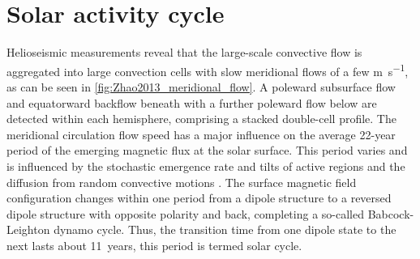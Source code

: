 \section{Solar activity cycle}
\label{sec:solar_activity_cycle}
Helioseismic measurements reveal that the large-scale convective flow is aggregated into large convection cells with slow meridional flows of a few \si{\m\per\s}, as can be seen in \autoref{fig:Zhao2013_meridional_flow}. A poleward subsurface flow and equatorward backflow beneath with a further poleward flow below are detected within each hemisphere, comprising a stacked double-cell profile. The meridional circulation flow speed has a major influence on the average 22-year period of the emerging magnetic flux at the solar surface. This period varies and is influenced by the stochastic emergence rate and tilts of active regions and the diffusion from random convective motions \citep{Hathaway2016}. The surface magnetic field configuration changes within one period from a dipole structure to a reversed dipole structure with opposite polarity and back, completing a so-called Babcock-Leighton dynamo cycle. Thus, the transition time from one dipole state to the next lasts about 11~years, this period is termed solar cycle.

